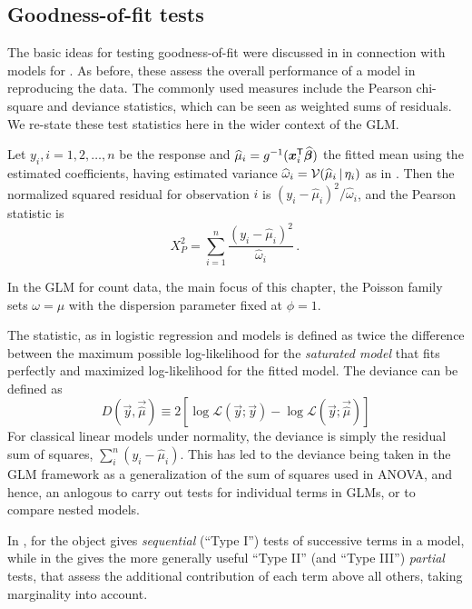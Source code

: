 \documentclass[11pt]{book}\usepackage[]{graphicx}\usepackage[]{color}
\begin{document}
\subsection{Goodness-of-fit tests}\label{sec:glm-goodfit}
The basic ideas for testing goodness-of-fit were discussed in 
in connection with \loglin models for \ctabs.
As before, these assess the overall performance of a model in reproducing the data.
The commonly used measures include the Pearson chi-square and
\LR deviance statistics, which can be seen as weighted sums of residuals.
We re-state these test statistics here in the wider context of the GLM.

Let $y_i, i=1, 2, \dots, n$ be the response and $\widehat{\mu}_i = g^{-1} (\bm{x}_i^\mathsf{T} \widehat{\bm{\beta}})$
the fitted mean using the estimated coefficients, having estimated variance
$\widehat{\omega}_i = \mathcal{V}(\widehat{\mu}_i\, | \, \eta_i)$ as in .
Then the normalized squared residual for observation $i$ is
$(y_i - \widehat{\mu}_i)^2 / \widehat{\omega}_i$, and the Pearson statistic is
\begin{equation}\label{eq:pearson}
X^2_P = \sum_{i=1}^n \frac{(y_i - \widehat{\mu}_i)^2}{\widehat{\omega}_i} \period
\end{equation}

In the GLM for count data, the main focus of this chapter, the Poisson family
sets $\omega = \mu$ with the dispersion parameter fixed at $\phi=1$.

The  statistic, as in logistic regression and \loglin models
is defined as twice the difference between the maximum possible log-likelihood
for the \emph{saturated model} that fits perfectly and maximized log-likelihood
for the fitted model. The deviance can be defined as
\begin{equation*}
D (\vec{y}, \vec{\widehat{\mu}}) \equiv 2 [ \log \mathcal{L}(\vec{y};\vec{y}) - \log \mathcal{L}(\vec{y};\vec{\widehat{\mu}})]
\end{equation*}
For classical linear models under normality, the deviance is simply the residual sum of squares,
$\sum_i^n (y_i - \widehat{\mu}_i)$.  This has led to the deviance being taken in the GLM
framework as a generalization of the sum of squares used in ANOVA, and hence, an anlogous
 to carry out tests for individual terms in GLMs, or to compare
nested models.  

In \R,  for the  object 
gives \emph{sequential} (``Type I'') tests of successive terms in a model, while
 in the  gives the more generally useful 
``Type II'' (and ``Type III'') \emph{partial} tests, that assess the additional
contribution of each term above all others, taking marginality into account.
\end{document}
